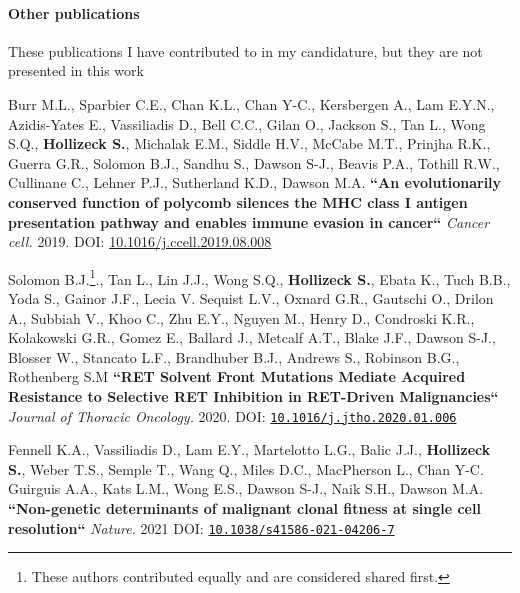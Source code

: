 {\hrulefill

\paragraph*{Other publications} These publications I have contributed to in my candidature, but they are not presented in this work

Burr M.L., Sparbier C.E., Chan K.L., Chan Y-C., Kersbergen A., Lam E.Y.N., Azidis-Yates E., Vassiliadis D., Bell C.C., Gilan O., Jackson S., Tan L., Wong S.Q., \textbf{Hollizeck S.}, Michalak E.M., Siddle H.V.,  McCabe M.T., Prinjha R.K., Guerra G.R., Solomon B.J., Sandhu S.,  Dawson S-J., Beavis P.A., Tothill R.W., Cullinane C., Lehner P.J., Sutherland K.D., Dawson M.A. \textbf{``An evolutionarily conserved function of polycomb silences the MHC class I antigen presentation pathway and enables immune evasion in cancer``} \textit{Cancer cell.} 2019. DOI: \href{https://doi.org/10.1016/j.ccell.2019.08.008}{10.1016/j.ccell.2019.08.008}

Solomon B.J.\footnote{These authors contributed equally and are considered shared first.}., Tan L.\footnotemark[\value{footnote}], Lin J.J.\footnotemark[\value{footnote}], Wong S.Q.\footnotemark[\value{footnote}], \textbf{Hollizeck S.}\footnotemark[\value{footnote}], Ebata K., Tuch B.B., Yoda S., Gainor J.F., Lecia V. Sequist L.V., Oxnard G.R., Gautschi O., Drilon A., Subbiah V., Khoo C., Zhu E.Y., Nguyen M., Henry D., Condroski K.R., Kolakowski G.R., Gomez E., Ballard J., Metcalf A.T., Blake J.F., Dawson S-J., Blosser W., Stancato L.F., Brandhuber B.J., Andrews S., Robinson B.G., Rothenberg S.M
\textbf{``RET Solvent Front Mutations Mediate Acquired Resistance to Selective RET Inhibition in RET-Driven Malignancies``}
\textit{Journal of Thoracic Oncology.} 2020. DOI: \href{https://doi.org/10.1016/j.jtho.2020.01.006}{\nolinkurl{10.1016/j.jtho.2020.01.006}}

Fennell K.A.\footnotemark[\value{footnote}], Vassiliadis D.\footnotemark[\value{footnote}], Lam E.Y., Martelotto L.G., Balic J.J., \textbf{Hollizeck S.}, Weber T.S., Semple T., Wang Q., Miles D.C., MacPherson L., Chan Y-C. Guirguis A.A., Kats L.M., Wong E.S., Dawson S-J., Naik S.H., Dawson M.A. \textbf{``Non-genetic determinants of malignant clonal fitness at single cell resolution``} \textit{Nature.} 2021 DOI: \href{https://doi.org/10.1038/s41586-021-04206-7}{\nolinkurl{10.1038/s41586-021-04206-7}}





}
